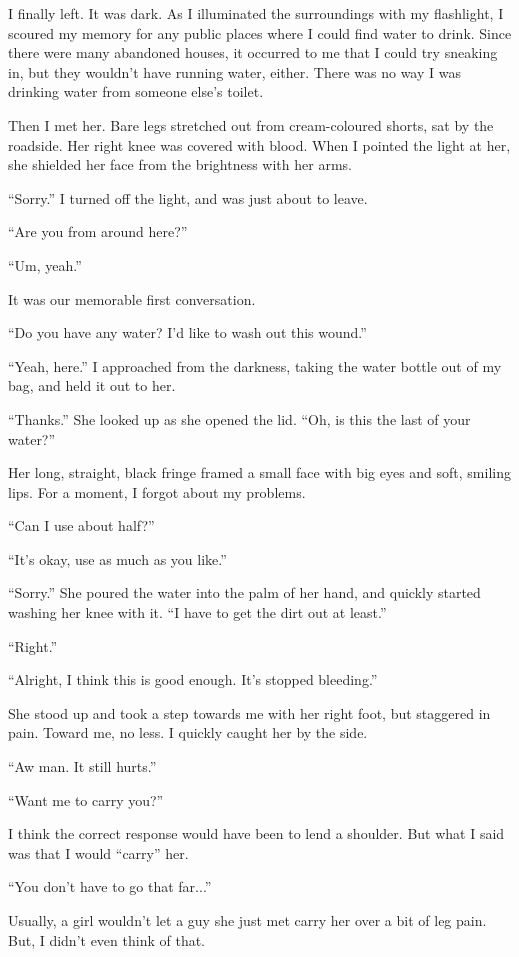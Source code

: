 \documentclass[oneside]{book}
\begin{document}
I finally left. It was dark. As I illuminated the surroundings with my flashlight, I scoured my memory for any public places where I could find water to drink. Since there were many abandoned houses, it occurred to me that I could try sneaking in, but they wouldn’t have running water, either. There was no way I was drinking water from someone else’s toilet.

Then I met her. Bare legs stretched out from cream-coloured shorts, sat by the roadside. Her right knee was covered with blood. When I pointed the light at her, she shielded her face from the brightness with her arms.

“Sorry.” I turned off the light, and was just about to leave.

“Are you from around here?”

“Um, yeah.”

It was our memorable first conversation.

“Do you have any water? I’d like to wash out this wound.”

“Yeah, here.” I approached from the darkness, taking the water bottle out of my bag, and held it out to her.

“Thanks.” She looked up as she opened the lid. “Oh, is this the last of your water?”

Her long, straight, black fringe framed a small face with big eyes and soft, smiling lips. For a moment, I forgot about my problems.

“Can I use about half?”

“It’s okay, use as much as you like.”

“Sorry.” She poured the water into the palm of her hand, and quickly started washing her knee with it. “I have to get the dirt out at least.”

“Right.”

“Alright, I think this is good enough. It’s stopped bleeding.”

She stood up and took a step towards me with her right foot, but staggered in pain. Toward me, no less. I quickly caught her by the side.

“Aw man. It still hurts.”

“Want me to carry you?”

I think the correct response would have been to lend a shoulder. But what I said was that I would “carry” her.

“You don’t have to go that far...”

Usually, a girl wouldn’t let a guy she just met carry her over a bit of leg pain. But, I didn’t even think of that.
\end{document}
